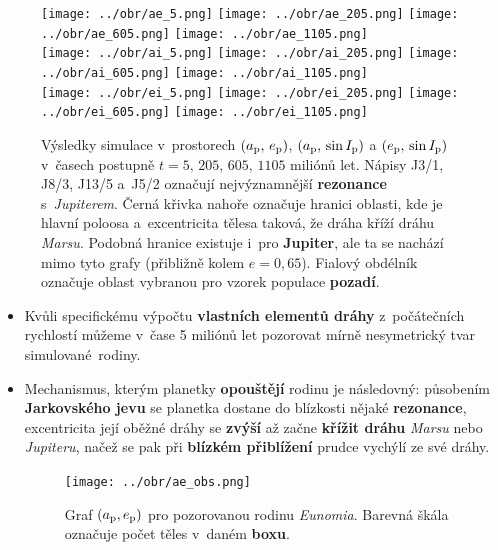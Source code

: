 \documentclass{beamer}
\newlength{\vyska}
\newlength{\vyskaB}
\newlength{\main}
\begin{document}
\begin{frame}
\begin{columns}[t]
\begin{column}{\main}
\begin{tcolorbox}[title=Simulace orbitálního vývoje\phantom{Úy},height=0.75\vyskaB]
	\begin{figure}[t]
		\centering
		\texttt{[image: ../obr/ae\_5.png]}
		\texttt{[image: ../obr/ae\_205.png]}
		\texttt{[image: ../obr/ae\_605.png]}
		\texttt{[image: ../obr/ae\_1105.png]}
\\
		\texttt{[image: ../obr/ai\_5.png]}
		\texttt{[image: ../obr/ai\_205.png]}
		\texttt{[image: ../obr/ai\_605.png]}
		\texttt{[image: ../obr/ai\_1105.png]}
\\
		\texttt{[image: ../obr/ei\_5.png]}
		\texttt{[image: ../obr/ei\_205.png]}
		\texttt{[image: ../obr/ei\_605.png]}
		\texttt{[image: ../obr/ei\_1105.png]}
			\captionsetup{width=.88\linewidth}
			\caption{Výsledky simulace v~prostorech $(a_{\rm p},\,e_{\rm p})$, $(a_{\rm p},\,\sin I_{\rm p})$ a  $(e_{\rm p},\,\sin I_{\rm p})$ v~časech postupně $t=5,\,205,\,605,\,1105$ miliónů let. Nápisy J3/1, J8/3, J13/5 a~J5/2 označují nejvýznamnější \textbf{rezonance} s~\textit{Jupiterem}. Černá křivka nahoře označuje hranici oblasti, kde je hlavní poloosa a~excentricita tělesa taková, že dráha kříží dráhu \textit{Marsu}. Podobná hranice existuje i~pro \textbf{Jupiter}, ale ta se nachází mimo tyto grafy (přibližně kolem $e=0,65$). Fialový obdélník označuje oblast vybranou pro vzorek populace \textbf{pozadí}.} \label{fig:ae_sim}
	\end{figure}

\begin{multicols}{2}

\begin{itemize}
\item 
Kvůli specifickému výpočtu \textbf{vlastních elementů dráhy} z~počátečních rychlostí můžeme v~čase 5 miliónů let pozorovat mírně nesymetrický tvar simulované~rodiny. 

\item Mechanismus, kterým planetky \textbf{opouštějí} rodinu je následovný: působením \textbf{Jarkovského jevu} se planetka dostane do blízkosti nějaké \textbf{rezonance}, excentricita její oběžné dráhy se \textbf{zvýší} až začne \textbf{křížit dráhu} \textit{Marsu} nebo \textit{Jupiteru}, načež se pak při \textbf{blízkém přiblížení} prudce vychýlí ze své dráhy.

\vspace{2cm}
	\begin{figure}
		\centering
		\texttt{[image: ../obr/ae\_obs.png]}
		\caption{Graf $(a_{\rm p}, e_{\rm p})$ pro pozorovanou rodinu \textit{Eunomia}. Barevná škála označuje počet těles v~daném \textbf{boxu}.}
	\end{figure}
\vfill\null\columnbreak


\end{itemize}
\end{multicols}
\end{tcolorbox}
\end{column}
\end{columns}
\end{frame}
\end{document}
